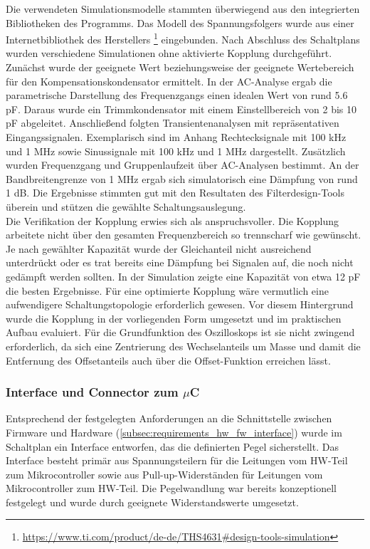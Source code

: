 \documentclass[a4paper, portrait, 12pt]{scrartcl} %
\begin{document}
Die verwendeten Simulationsmodelle stammten überwiegend aus den integrierten Bibliotheken des Programms. Das Modell des Spannungsfolgers wurde aus einer Internetbibliothek des Herstellers \footnote{\url{https://www.ti.com/product/de-de/THS4631\#design-tools-simulation}} eingebunden. Nach Abschluss des Schaltplans wurden verschiedene Simulationen ohne aktivierte Kopplung durchgeführt. Zunächst wurde der geeignete Wert beziehungsweise der geeignete Wertebereich für den Kompensationskondensator ermittelt. In der AC-Analyse ergab die parametrische Darstellung des Frequenzgangs einen idealen Wert von rund 5.6 pF. Daraus wurde ein Trimmkondensator mit einem Einstellbereich von 2 bis 10 pF abgeleitet. Anschließend folgten Transientenanalysen mit repräsentativen Eingangssignalen. Exemplarisch sind im Anhang Rechtecksignale mit 100 kHz und 1 MHz sowie Sinussignale mit 100 kHz und 1 MHz dargestellt. Zusätzlich wurden Frequenzgang und Gruppenlaufzeit über AC-Analysen bestimmt. An der Bandbreitengrenze von 1 MHz ergab sich simulatorisch eine Dämpfung von rund 1 dB. Die Ergebnisse stimmten gut mit den Resultaten des Filterdesign-Tools überein und stützen die gewählte Schaltungsauslegung.\\

Die Verifikation der Kopplung erwies sich als anspruchsvoller. Die Kopplung arbeitete nicht über den gesamten Frequenzbereich so trennscharf wie gewünscht. Je nach gewählter Kapazität wurde der Gleichanteil nicht ausreichend unterdrückt oder es trat bereits eine Dämpfung bei Signalen auf, die noch nicht gedämpft werden sollten. In der Simulation zeigte eine Kapazität von etwa 12 pF die besten Ergebnisse. Für eine optimierte Kopplung wäre vermutlich eine aufwendigere Schaltungstopologie erforderlich gewesen. Vor diesem Hintergrund wurde die Kopplung in der vorliegenden Form umgesetzt und im praktischen Aufbau evaluiert. Für die Grundfunktion des Oszilloskops ist sie nicht zwingend erforderlich, da sich eine Zentrierung des Wechselanteils um Masse und damit die Entfernung des Offsetanteils auch über die Offset-Funktion erreichen lässt.


\subsubsection{Interface und Connector zum $\mu$C}

Entsprechend der festgelegten Anforderungen an die Schnittstelle zwischen Firmware und Hardware (\autoref{subsec:requirements_hw_fw_interface}) wurde im Schaltplan ein Interface entworfen, das die definierten Pegel sicherstellt. Das Interface besteht primär aus Spannungsteilern für die Leitungen vom HW-Teil zum Mikrocontroller sowie aus Pull-up-Widerständen für Leitungen vom Mikrocontroller zum HW-Teil. Die Pegelwandlung war bereits konzeptionell festgelegt und wurde durch geeignete Widerstandswerte umgesetzt.
\end{document}
